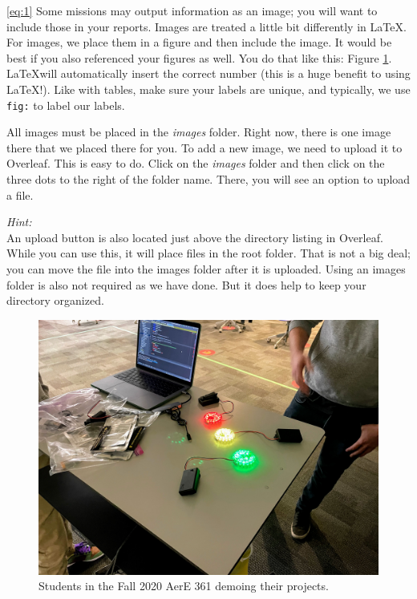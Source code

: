 \documentclass{report}
\begin{document}
\ref{eq:1}
Some missions may output information as an image; you will want to include those in your reports. Images are treated a little bit differently in \LaTeX. For images, we place them in a figure and then include the image. It would be best if you also referenced your figures as well. You do that like this: Figure \ref{fig:361_demo}. \LaTeX will automatically insert the correct number (this is a huge benefit to using \LaTeX!). Like with tables, make sure your labels are unique, and typically, we use \texttt{fig:} to label our labels.

All images must be placed in the \emph{images} folder. Right now, there is one image there that we placed there for you. To add a new image, we need to upload it to Overleaf. This is easy to do. Click on the \emph{images} folder and then click on the three dots to the right of the folder name. There, you will see an option to upload a file.

\begin{tcolorbox}
\emph{Hint:} \\
An upload button is also located just above the directory listing in Overleaf. While you can use this, it will place files in the root folder. That is not a big deal; you can move the file into the images folder after it is uploaded. Using an images folder is also not required as we have done. But it does help to keep your directory organized.
\end{tcolorbox}

\begin{figure}[ht]
\centering
\includegraphics[width=6in]{images/IMG_0038.jpg}
\caption{Students in the Fall 2020 AerE 361 demoing their projects.}
\label{fig:361_demo}
\end{figure}
\end{document}
